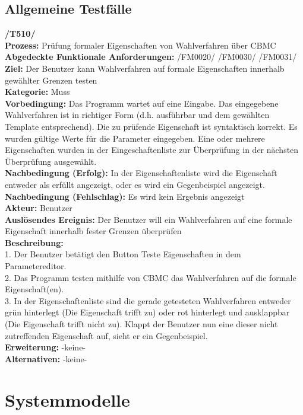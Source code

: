 \documentclass[a4paper]{scrreprt}
\begin{document}
\section{Allgemeine Testfälle}
\textbf{/T510/} \\
\textbf{Prozess: }Prüfung formaler Eigenschaften von Wahlverfahren über CBMC \\
\textbf{Abgedeckte Funktionale Anforderungen:} /FM0020/ /FM0030/ /FM0031/ \\
\textbf{Ziel:} Der Benutzer kann Wahlverfahren auf formale Eigenschaften innerhalb gewählter Grenzen testen\\
\textbf{Kategorie:} Muss\\
\textbf{Vorbedingung:} Das Programm wartet auf eine Eingabe. Das eingegebene Wahlverfahren ist in richtiger Form (d.h. ausführbar und dem gewählten Template entsprechend). Die zu prüfende Eigenschaft ist syntaktisch korrekt. Es wurden gültige Werte für die Parameter eingegeben. Eine oder mehrere Eigenschaften wurden in der Eingeschaftenliste zur Überprüfung in der nächsten Überprüfung ausgewählt. \\
\textbf{Nachbedingung (Erfolg):} In der Eigenschaftenliste wird die Eigenschaft entweder als erfüllt angezeigt, oder es wird ein Gegenbeispiel angezeigt.\\
\textbf{Nachbedingung (Fehlschlag):} Es wird kein Ergebnis angezeigt\\
\textbf{Akteur:} Benutzer\\
\textbf{Auslösendes Ereignis:} Der Benutzer will ein Wahlverfahren auf eine formale Eigenschaft innerhalb fester Grenzen überprüfen\\
\textbf{Beschreibung:} \\
1. Der Benutzer betätigt den Button Teste Eigenschaften in dem Parametereditor. \\
2. Das Programm testen mithilfe von CBMC das Wahlverfahren auf die formale Eigenschaft(en). \\
3. In der Eigenschaftenliste sind die gerade getesteten Wahlverfahren entweder grün hinterlegt (Die Eigenschaft trifft zu) oder rot hinterlegt und ausklappbar (Die Eigenschaft trifft nicht zu). Klappt der Benutzer nun eine dieser nicht zutreffenden Eigenschaft auf, sieht er ein Gegenbeispiel. \\
\textbf {Erweiterung:} -keine- \\
\textbf {Alternativen:} -keine- \\

\chapter{Systemmodelle}
\end{document}
